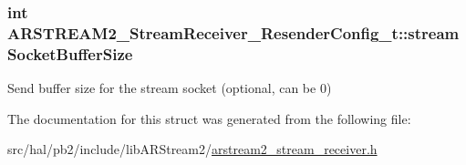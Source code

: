 \subsubsection[{\texorpdfstring{stream\+Socket\+Buffer\+Size}{streamSocketBufferSize}}]{\setlength{\rightskip}{0pt plus 5cm}int A\+R\+S\+T\+R\+E\+A\+M2\+\_\+\+Stream\+Receiver\+\_\+\+Resender\+Config\+\_\+t\+::stream\+Socket\+Buffer\+Size}\hypertarget{struct_a_r_s_t_r_e_a_m2___stream_receiver___resender_config__t_af3f3cb6602a1e436b254c157b54a8a10}{}\label{struct_a_r_s_t_r_e_a_m2___stream_receiver___resender_config__t_af3f3cb6602a1e436b254c157b54a8a10}
Send buffer size for the stream socket (optional, can be 0) 

The documentation for this struct was generated from the following file\+:\begin{DoxyCompactItemize}
\item 
src/hal/pb2/include/lib\+A\+R\+Stream2/\hyperlink{arstream2__stream__receiver_8h}{arstream2\+\_\+stream\+\_\+receiver.\+h}\end{DoxyCompactItemize}
